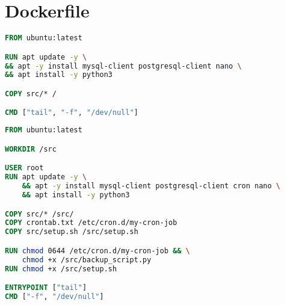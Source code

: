 \chapter{Dockerfile}
\label{sec:dockerfile}
\begin{lstlisting}[language=Dockerfile, caption={Dockerfile gebruikt voor de images van de Kubernetes pods in de POC.}]
FROM ubuntu:latest

RUN apt update -y \
&& apt -y install mysql-client postgresql-client nano \
&& apt install -y python3

COPY src/* /

CMD ["tail", "-f", "/dev/null"]
\end{lstlisting}
\begin{lstlisting}[language=Dockerfile, caption={Dockerfile gebruikt voor het veranderen naar Kubernetes.}]
FROM ubuntu:latest

WORKDIR /src

USER root
RUN apt update -y \
    && apt -y install mysql-client postgresql-client cron nano \
    && apt install -y python3

COPY src/* /src/
COPY crontab.txt /etc/cron.d/my-cron-job
COPY src/setup.sh /src/setup.sh

RUN chmod 0644 /etc/cron.d/my-cron-job && \
    chmod +x /src/backup_script.py
RUN chmod +x /src/setup.sh

ENTRYPOINT ["tail"]
CMD ["-f", "/dev/null"]

\end{lstlisting}

